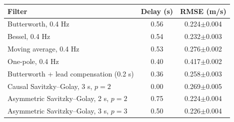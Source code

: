 \begin{tabular}{@{}lcc@{}}
\toprule
Filter & Delay (s) & RMSE (m/s) \\
\midrule
Butterworth, 0.4 Hz & 0.56 & 0.224$\pm$0.004 \\
Bessel, 0.4 Hz & 0.54 & 0.232$\pm$0.003 \\
Moving average, 0.4 Hz & 0.53 & 0.276$\pm$0.002 \\
One-pole, 0.4 Hz & 0.40 & 0.417$\pm$0.002 \\
Butterworth + lead compensation (0.2 s) & 0.36 & 0.258$\pm$0.003 \\
Causal Savitzky--Golay, 3 s, $p=2$ & 0.00 & 0.269$\pm$0.005 \\
Asymmetric Savitzky--Golay, 2 s, $p=2$ & 0.75 & 0.224$\pm$0.004 \\
Asymmetric Savitzky--Golay, 3 s, $p=3$ & 0.50 & 0.226$\pm$0.004 \\
\bottomrule
\end{tabular}
